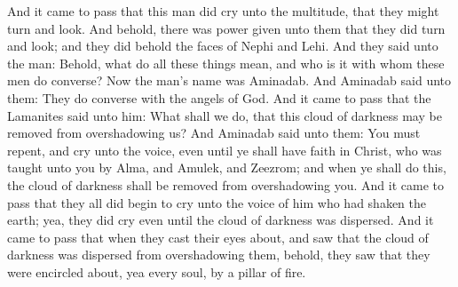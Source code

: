 \bverse \iffalse And it came to pass that this man did cry unto the multitude, that they might turn and look. And behold, there was power given unto them that they did turn and look; and they did behold the faces of Nephi and Lehi. \fi
And it came to pass that this man did cry unto the multitude, that they might turn and look. And behold, there was power given unto them that they did turn and look; and they did behold the faces of Nephi and Lehi.
\bverse \iffalse And they said unto the man: Behold, what do all these things mean, and who is it with whom these men do converse? \fi
And they said unto the man: Behold, what do all these things mean, and who is it with whom these men do converse?
\bverse \iffalse Now the man's name was Aminadab. And Aminadab said unto them: They do converse with the angels of God. \fi
Now the man's name was Aminadab. And Aminadab said unto them: They do converse with the angels of God.
\bverse \iffalse And it came to pass that the Lamanites said unto him: What shall we do, that this cloud of darkness may be removed from overshadowing us? \fi
And it came to pass that the Lamanites said unto him: What shall we do, that this cloud of darkness may be removed from overshadowing us?
\bverse \iffalse And Aminadab said unto them: You must repent, and cry unto the voice, even until ye shall have faith in Christ, who was taught unto you by Alma, and Amulek, and Zeezrom; and when ye shall do this, the cloud of darkness shall be removed from overshadowing you. \fi
And Aminadab said unto them: You must repent, and cry unto the voice, even until ye shall have faith in Christ, who was taught unto you by Alma, and Amulek, and Zeezrom; and when ye shall do this, the cloud of darkness shall be removed from overshadowing you.
\bverse \iffalse And it came to pass that they all did begin to cry unto the voice of him who had shaken the earth; yea, they did cry even until the cloud of darkness was dispersed. \fi
And it came to pass that they all did begin to cry unto the voice of him who had shaken the earth; yea, they did cry even until the cloud of darkness was dispersed.
\bverse \iffalse And it came to pass that when they cast their eyes about, and saw that the cloud of darkness was dispersed from overshadowing them, behold, they saw that they were encircled about, yea every soul, by a pillar of fire. \fi
And it came to pass that when they cast their eyes about, and saw that the cloud of darkness was dispersed from overshadowing them, behold, they saw that they were encircled about, yea every soul, by a pillar of fire.
